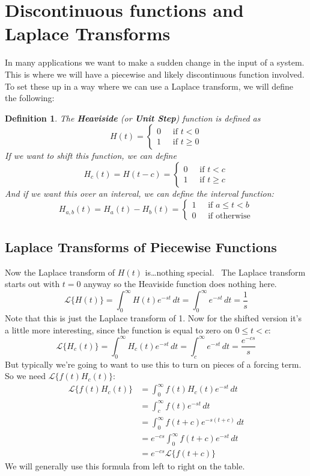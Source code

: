 \documentclass[letterpaper, 11pt, openany]{book}
\theoremstyle{mytheoremstyle}
\newtheorem{definition}{Definition}[section]
\theoremstyle{myexamplestyle}
\begin{document}
\section{Discontinuous functions and Laplace Transforms}
\setcounter{figure}{0}
In many applications we want to make a sudden change in the input of a system. This is where we will have a piecewise and likely discontinuous function involved. To set these up in a way where we can use a Laplace transform, we will define the following:

\begin{definition}\label{d:heaviside-function}
    The \textbf{Heaviside} (or \textbf{Unit Step}) function is defined as
    \[H(t) = \begin{cases}
        0 \; &\text{ if } t<0\\
        1 \; &\text{ if } t\geq 0
    \end{cases}\]
    If we want to shift this function, we can define
    \[H_{c}(t) = H(t-c) = \begin{cases}
        0 \; &\text{ if } t<c\\
        1 \; &\text{ if } t\geq c
    \end{cases}\]
    And if we want this over an interval, we can define the interval function:
    \[H_{a,b}(t) = H_{a}(t) - H_{b}(t) = \begin{cases}
        1\; &\text{ if } a \leq t < b\\
        0\; &\text{ if }\text{otherwise}
    \end{cases}
    \]
\end{definition}

\subsection{Laplace Transforms of Piecewise Functions}

Now the Laplace transform of \(H(t)\) is\dots nothing special. \faMeh \ The Laplace transform starts out with \(t=0\) anyway so the Heaviside function does nothing here.
\[\mathcal{L}\{H(t)\} = \int_{0}^{\infty} H(t) e^{-st}\, dt = \int_{0}^{\infty} e^{-st}\, dt = \frac{1}{s}\]
Note that this is just the Laplace transform of 1. Now for the shifted version it's a little more interesting, since the function is equal to zero on \(0 \leq t < c\):
\[\mathcal{L}\{H_c (t)\} = \int_{0}^{\infty} H_c (t) e^{-st}\, dt = \int_{c}^{\infty} e^{-st} \, dt = \frac{e^{-cs}}{s}\]
But typically we're going to want to use this to turn on pieces of a forcing term. So we need \(\mathcal{L}\{f(t)H_{c}(t)\}\):
\begin{align*}
    \mathcal{L}\{f(t) H_c (t)\} &= \int_{0}^{\infty} f(t)H_c (t) e^{-st}\, dt\\
                                &=\int_{c}^{\infty} f(t)e^{-st} \, dt\\
                                &=\int_{0}^{\infty} f(t+c)e^{-s(t+c)}\, dt\\
                                &=e^{-cs}\int_{0}^{\infty} f(t+c)e^{-st}\, dt\\
                                &= e^{-cs} \mathcal{L}\{f(t + c)\}
\end{align*}
We will generally use this formula from left to right on the table.
\end{document}
